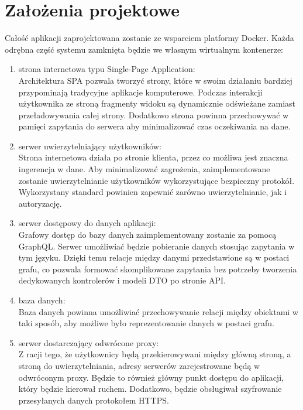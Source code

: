 \section{Założenia projektowe}
	Całość aplikacji zaprojektowana zostanie ze wsparciem platformy Docker.
	Każda odrębna część systemu zamknięta będzie we własnym wirtualnym kontenerze:
	\begin{enumerate}
		\item strona internetowa typu Single-Page Application:\\
			Architektura SPA pozwala tworzyć strony, które w swoim działaniu bardziej przypominają tradycyjne aplikacje komputerowe.
			Podczas interakcji użytkownika ze stroną fragmenty widoku są dynamicznie odświeżane zamiast przeładowywania całej strony.
			Dodatkowo strona powinna przechowywać w pamięci zapytania do serwera aby minimalizować czas oczekiwania na dane.

		\item serwer uwierzytelniający użytkowników:\\
			Strona internetowa działa po stronie klienta, przez co możliwa jest znaczna ingerencja w dane.
			Aby minimalizować zagrożenia, zaimplementowane zostanie uwierzytelnianie użytkowników wykorzystujące bezpieczny protokół.
			Wykorzystany standard powinien zapewnić zarówno uwierzytelnianie, jak i autoryzację.

		\item serwer dostępowy do danych aplikacji:\\
			Grafowy dostęp do bazy danych zaimplementowany zostanie za pomocą GraphQL\@.
			Serwer umożliwiać będzie pobieranie danych stosując zapytania w tym języku.
			Dzięki temu relacje między danymi przedstawione są w postaci grafu,
			co pozwala formować skomplikowane zapytania bez potrzeby tworzenia dedykowanych kontrolerów i modeli DTO po stronie API\@.

		\item baza danych:\\
			Baza danych powinna umożliwiać przechowywanie relacji między obiektami w taki sposób,
			aby możliwe było reprezentowanie danych w postaci grafu.

		\item serwer dostarczający odwrócone proxy:\\
			Z racji tego, że użytkownicy będą przekierowywani między główną stroną, a stroną do uwierzytelniania,
			adresy serwerów zarejestrowane będą w odwróconym proxy.
			Będzie to również główny punkt dostępu do aplikacji, który będzie kierował ruchem.
			Dodatkowo, będzie obsługiwał szyfrowanie przesyłanych danych protokołem HTTPS\@.

	\end{enumerate}
